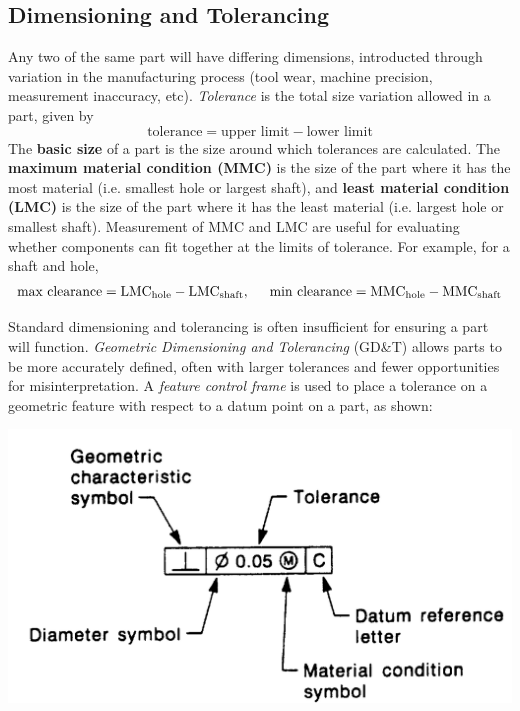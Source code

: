 
\subsection{Dimensioning and Tolerancing}

Any two of the same part will have differing dimensions, introducted through variation in the manufacturing process (tool wear, machine precision, measurement inaccuracy, etc). \textit{Tolerance} is the total size variation allowed in a part, given by \[\text{tolerance} = \text{upper limit}-\text{lower limit}\] The \textbf{basic size} of a part is the size around which tolerances are calculated. The \textbf{maximum material condition (MMC)} is the size of the part where it has the most material (i.e. smallest hole or largest shaft), and \textbf{least material condition (LMC)} is the size of the part where it has the least material (i.e. largest hole or smallest shaft). Measurement of MMC and LMC are useful for evaluating whether components can fit together at the limits of tolerance. For example, for a shaft and hole, \[\text{max clearance}=\text{LMC}_\text{hole}-\text{LMC}_\text{shaft},\hspace{0.2in}\text{min clearance} = \text{MMC}_\text{hole}-\text{MMC}_\text{shaft}\]

Standard dimensioning and tolerancing is often insufficient for ensuring a part will function. \textit{Geometric Dimensioning and Tolerancing} (GD\&T) allows parts to be more accurately defined, often with larger tolerances and fewer opportunities for misinterpretation. A \textit{feature control frame} is used to place a tolerance on a geometric feature with respect to a datum point on a part, as shown:

\begin{center}
    \includegraphics[scale=0.3]{Images/x50_gd&t.png}
\end{center}

